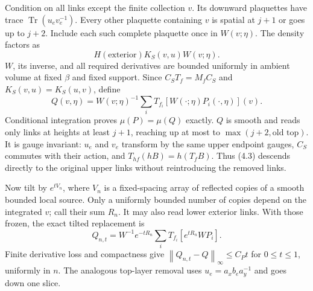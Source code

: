 \documentclass[11pt]{article}
\theoremstyle{remark}
\newcommand{\tr}{\operatorname{Tr}}
\newcommand{\norm}[1]{\left\|#1\right\|}
\begin{document}
Condition on all links except the finite collection $v$.
Its downward plaquettes have trace $\tr(u_ev_e^{-1})$.
Every other plaquette containing $v$ is spatial at $j+1$ or goes
up to $j+2$. Include each such complete plaquette once in $W(v;\eta)$.
The density factors as
\[
 H(\mathrm{exterior})K_S(v,u)W(v;\eta).
\]
$W$, its inverse, and all required derivatives are bounded uniformly
in ambient volume at fixed $\beta$ and fixed support.
Since $C_ST_f=M_fC_S$ and $K_S(v,u)=K_S(u,v)$, define
\[
 Q(v,\eta)=W(v;\eta)^{-1}
          \sum_i T_{f_i}[W(\cdot;\eta)P_i(\cdot,\eta)](v).
 \tag{4.3}
\]
Conditional integration proves $\mu(P)=\mu(Q)$ exactly.
$Q$ is smooth and reads only links at heights at least $j+1$,
reaching up at most to $\max(j+2,\text{old top})$.
It is gauge invariant: $u_e$ and $v_e$ transform by the same
upper endpoint gauges, $C_S$ commutes with their action, and
$T_{hf}(hB)=h(T_fB)$. Thus (4.3) descends directly to the original
upper links without reintroducing the removed links.

Now tilt by $e^{tV_n}$, where $V_n$ is a fixed-spacing array of
reflected copies of a smooth bounded local source. Only a uniformly
bounded number of copies depend on the integrated $v$; call their sum
$R_n$. It may also read lower exterior links. With those frozen,
the exact tilted replacement is
\[
 Q_{n,t}=W^{-1}e^{-tR_n}
           \sum_iT_{f_i}[e^{tR_n}WP_i].
 \tag{4.4}
\]
Finite derivative loss and compactness give
$\norm{Q_{n,t}-Q}_\infty\le C_Pt$ for $0\le t\le1$,
uniformly in $n$. The analogous top-layer removal uses
$u_e=a_xb_ea_y^{-1}$ and goes down one slice.
\end{document}
